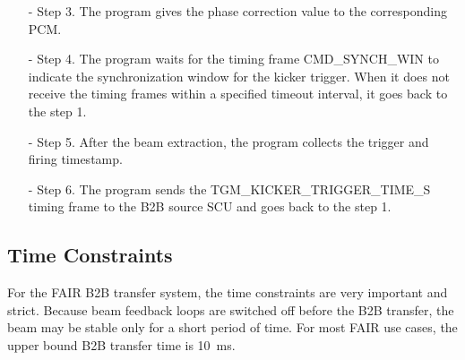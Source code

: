 \begin{itemize}
\begin{itemize}
		\item[-]Step 3. The program gives the phase correction value to the corresponding PCM.
 		\item[-]Step 4. The program waits for the timing frame CMD\_SYNCH\_WIN to indicate the synchronization window for the kicker trigger. When it does not receive the timing frames within a specified timeout interval, it goes back to the step 1.
		\item[-]Step 5. After the beam extraction, the program collects the trigger and firing timestamp. 
		\item[-]Step 6. The program sends the TGM\_KICKER\_TRIGGER\_TIME\_S timing frame to the B2B source SCU and goes back to the step 1.
	\end{itemize}

\end{itemize}
\subsection{Time Constraints}
\label{sec:time_constraint}
For the FAIR B2B transfer system, the time constraints are very important and strict. Because beam feedback loops are switched off before the B2B transfer, the beam may be stable only for a short period of time. For most FAIR use cases, the upper bound B2B transfer time is \SI{10}{\ms}. 

